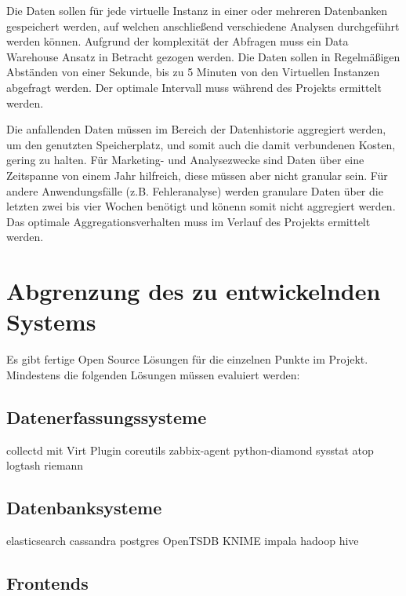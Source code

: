 Die Daten sollen für jede virtuelle Instanz in einer oder mehreren Datenbanken
gespeichert werden, auf welchen anschließend verschiedene Analysen
durchgeführt werden können. Aufgrund der komplexität der Abfragen muss ein
Data Warehouse Ansatz in Betracht gezogen werden. Die Daten sollen in
Regelmäßigen Abständen von einer Sekunde, bis zu 5 Minuten von den Virtuellen
Instanzen abgefragt werden. Der optimale Intervall muss während des Projekts
ermittelt werden.

Die anfallenden Daten müssen im Bereich der Datenhistorie aggregiert werden, 
um den genutzten Speicherplatz, und somit auch die damit verbundenen Kosten, gering zu halten.
Für Marketing- und Analysezwecke sind Daten über eine Zeitspanne von einem Jahr hilfreich, diese 
müssen aber nicht granular sein. Für andere Anwendungsfälle (z.B. 
Fehleranalyse) werden granulare Daten über die letzten zwei bis vier Wochen 
benötigt und könenn somit nicht aggregiert werden.
Das optimale Aggregationsverhalten muss im Verlauf des Projekts ermittelt werden.

\section{Abgrenzung des zu entwickelnden Systems}

Es gibt fertige Open Source Lösungen für die einzelnen Punkte im Projekt.
Mindestens die folgenden Lösungen müssen evaluiert werden:

\subsection{Datenerfassungssysteme}

\begin{outline}
  \1 collectd mit Virt Plugin
  \1 coreutils
  \1 zabbix-agent
  \1 python-diamond
  \1 sysstat
  \1 atop
  \1 logtash
  \1 riemann
\end{outline}

\subsection{Datenbanksysteme}

\begin{outline}
  \1 elasticsearch
  \1 cassandra
  \1 postgres
  \1 OpenTSDB
  \1 KNIME
  \1 impala
  \1 hadoop
  \1 hive
\end{outline}

\subsection{Frontends}

